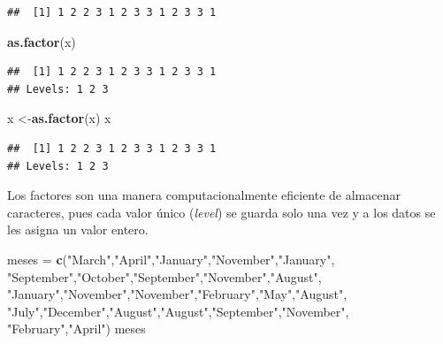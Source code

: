 \documentclass[
]{book}
\newenvironment{Shaded}{\begin{snugshade}}{\end{snugshade}}
\newcommand{\FunctionTok}[1]{\textcolor[rgb]{0.13,0.29,0.53}{\textbf{#1}}}
\newcommand{\NormalTok}[1]{#1}
\newcommand{\OtherTok}[1]{\textcolor[rgb]{0.56,0.35,0.01}{#1}}
\newcommand{\StringTok}[1]{\textcolor[rgb]{0.31,0.60,0.02}{#1}}
\begin{document}
\begin{verbatim}
##  [1] 1 2 2 3 1 2 3 3 1 2 3 3 1
\end{verbatim}

\begin{Shaded}
\begin{Highlighting}[]
\FunctionTok{as.factor}\NormalTok{(x)}
\end{Highlighting}
\end{Shaded}

\begin{verbatim}
##  [1] 1 2 2 3 1 2 3 3 1 2 3 3 1
## Levels: 1 2 3
\end{verbatim}

\begin{Shaded}
\begin{Highlighting}[]
\NormalTok{x }\OtherTok{\textless{}{-}}\FunctionTok{as.factor}\NormalTok{(x)}
\NormalTok{x}
\end{Highlighting}
\end{Shaded}

\begin{verbatim}
##  [1] 1 2 2 3 1 2 3 3 1 2 3 3 1
## Levels: 1 2 3
\end{verbatim}

Los factores son una manera computacionalmente eficiente de almacenar caracteres, pues cada valor único (\emph{level}) se guarda solo una vez y a los datos se les asigna un valor entero.

\begin{Shaded}
\begin{Highlighting}[]
\NormalTok{meses }\OtherTok{=} \FunctionTok{c}\NormalTok{(}\StringTok{"March"}\NormalTok{,}\StringTok{"April"}\NormalTok{,}\StringTok{"January"}\NormalTok{,}\StringTok{"November"}\NormalTok{,}\StringTok{"January"}\NormalTok{,}
       \StringTok{"September"}\NormalTok{,}\StringTok{"October"}\NormalTok{,}\StringTok{"September"}\NormalTok{,}\StringTok{"November"}\NormalTok{,}\StringTok{"August"}\NormalTok{,}
        \StringTok{"January"}\NormalTok{,}\StringTok{"November"}\NormalTok{,}\StringTok{"November"}\NormalTok{,}\StringTok{"February"}\NormalTok{,}\StringTok{"May"}\NormalTok{,}\StringTok{"August"}\NormalTok{,}
        \StringTok{"July"}\NormalTok{,}\StringTok{"December"}\NormalTok{,}\StringTok{"August"}\NormalTok{,}\StringTok{"August"}\NormalTok{,}\StringTok{"September"}\NormalTok{,}\StringTok{"November"}\NormalTok{,}
         \StringTok{"February"}\NormalTok{,}\StringTok{"April"}\NormalTok{)}
\NormalTok{meses}
\end{Highlighting}
\end{Shaded}
\end{document}
